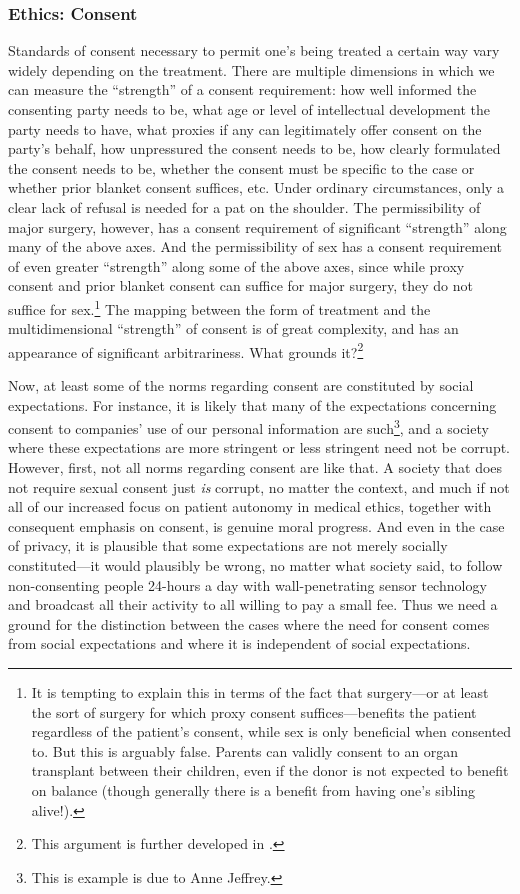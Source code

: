 \subsubsection{Ethics: Consent}
Standards of consent necessary to permit one's being treated a certain way vary widely depending on the treatment.
There are multiple dimensions in which we can measure the ``strength'' of a consent requirement: how well informed the 
consenting party needs to be, what age or level of intellectual development the party needs to have, what proxies if
any can legitimately offer consent on the party's behalf, how unpressured the consent needs to be, how clearly formulated the consent
needs to be, whether the consent must be specific to the case or whether prior blanket consent suffices, etc.
Under ordinary circumstances, only a clear lack of refusal is needed for a pat on the shoulder. The permissibility
of major surgery, however, has a consent requirement of significant ``strength'' along many of the above axes. 
And the permissibility of sex has a consent requirement of even greater ``strength'' along some of the above axes,
since while proxy consent and prior blanket consent can suffice for major surgery, they do not suffice for sex.\footnote{It is tempting
to explain this in terms of the fact that surgery---or at least the sort of surgery for which proxy consent suffices---benefits 
the patient regardless of the patient's consent, while sex is only beneficial when consented to. But this is arguably false.
Parents can validly consent to an organ transplant between their children, even if the donor is not expected to benefit
on balance (though generally there is a benefit from having one's sibling alive!).} The mapping between
the form of treatment and the multidimensional ``strength'' of consent is of great complexity, and has an appearance of significant
arbitrariness. What grounds it?\footnote{This argument is further developed in .}

Now, at least some of the norms regarding consent are constituted by social expectations. For instance, it is likely
that many of the expectations concerning consent to companies' use of our personal information are such\footnote{This
is example is due to Anne Jeffrey.}, and a society
where these expectations are more stringent or less stringent need not be corrupt. However, first, not all norms
regarding consent are like that. A society that does not require sexual consent just \textit{is} corrupt, no matter
the context, and much if not all of our increased focus on patient autonomy in medical ethics, together with consequent
emphasis on consent, is genuine moral progress. And even in the case of privacy, it is plausible that some
expectations are not merely socially constituted---it would plausibly be wrong, no matter what society
said, to follow non-consenting people 24-hours a day with wall-penetrating sensor technology and broadcast all 
their activity to all willing to pay a small fee. Thus we need a ground for the distinction between the cases where the 
need for consent comes from social expectations and where it is independent of social expectations. 

